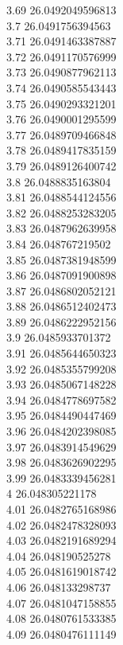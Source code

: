 {3.69	26.0492049596813\\
3.7	26.0491756394563\\
3.71	26.0491463387887\\
3.72	26.0491170576999\\
3.73	26.0490877962113\\
3.74	26.0490585543443\\
3.75	26.0490293321201\\
3.76	26.0490001295599\\
3.77	26.0489709466848\\
3.78	26.0489417835159\\
3.79	26.0489126400742\\
3.8	26.0488835163804\\
3.81	26.0488544124556\\
3.82	26.0488253283205\\
3.83	26.0487962639958\\
3.84	26.048767219502\\
3.85	26.0487381948599\\
3.86	26.0487091900898\\
3.87	26.0486802052121\\
3.88	26.0486512402473\\
3.89	26.0486222952156\\
3.9	26.0485933701372\\
3.91	26.0485644650323\\
3.92	26.0485355799208\\
3.93	26.0485067148228\\
3.94	26.0484778697582\\
3.95	26.0484490447469\\
3.96	26.0484202398085\\
3.97	26.0483914549629\\
3.98	26.0483626902295\\
3.99	26.0483339456281\\
4	26.048305221178\\
4.01	26.0482765168986\\
4.02	26.0482478328093\\
4.03	26.0482191689294\\
4.04	26.048190525278\\
4.05	26.0481619018742\\
4.06	26.048133298737\\
4.07	26.0481047158855\\
4.08	26.0480761533385\\
4.09	26.0480476111149\\
}
